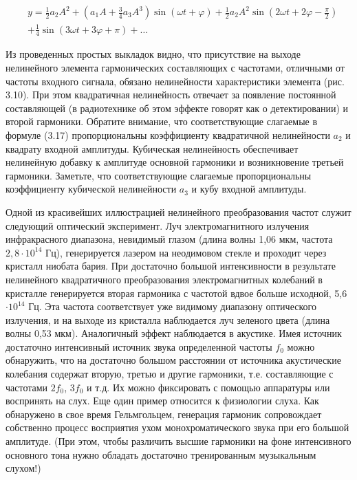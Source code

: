 \documentclass[10pt]{article}
\begin{document}
\begin{align*}
& y=\frac{1}{2} a_{2} A^{2}+\left(a_{1} A+\frac{3}{4} a_{3} A^{3}\right) \sin (\omega t+\varphi)+\frac{1}{2} a_{2} A^{2} \sin \left(2 \omega t+2 \varphi-\frac{\pi}{2}\right) \\
& +\frac{1}{4} \sin (3 \omega t+3 \varphi+\pi)+\ldots \tag{3.17}
\end{align*}


Из проведенных простых выкладок видно, что присутствие на выходе нелинейного элемента гармонических составляющих с частотами, отличными от частоты входного сигнала, обязано нелинейности характеристики элемента (рис. 3.10). При этом квадратичная нелинейность отвечает за появление постоянной составляющей (в радиотехнике об этом эффекте говорят как о детектировании) и второй гармоники. Обратите внимание, что соответствующие слагаемые в формуле (3.17) пропорциональны коэффициенту квадратичной нелинейности $a_{2}$ и квадрату входной амплитуды. Кубическая нелинейность обеспечивает нелинейную добавку к амплитуде основной гармоники и возникновение третьей гармоники. Заметьте, что соответствующие слагаемые пропорциональны коэффициенту кубической нелинейности $a_{3}$ и кубу входной амплитуды.

Одной из красивейших иллюстрацией нелинейного преобразования частот служит следующий оптический эксперимент. Луч электромагнитного излучения инфракрасного диапазона, невидимый глазом (длина волны 1,06 мкм, частота $2,8 \cdot 10^{14}$ Гц), генерируется лазером на неодимовом стекле и проходит через кристалл ниобата бария. При достаточно большой интенсивности в результате нелинейного квадратичного преобразования электромагнитных колебаний в кристалле генерируется вторая гармоника с частотой вдвое больше исходной, 5,6 $\cdot 10^{14}$ Гц. Эта частота соответствует уже видимому диапазону оптического излучения, и на выходе из кристалла наблюдается луч зеленого цвета (длина волны 0,53 мкм). Аналогичный эффект наблюдается в акустике. Имея источник достаточно интенсивный источник звука определенной частоты $f_{0}$ можно обнаружить, что на достаточно большом расстоянии от источника акустические колебания содержат вторую, третью и другие гармоники, т.е. составляющие с частотами $2 f_{0}$, $3 f_{0}$ и т.д. Их можно фиксировать с помощью аппаратуры или воспринять на слух. Еще один пример относится к физиологии слуха. Как обнаружено в свое время Гельмгольцем, генерация гармоник сопровождает собственно процесс восприятия ухом монохроматического звука при его большой амплитуде. (При этом, чтобы различить высшие гармоники на фоне интенсивного основного тона нужно обладать достаточно тренированным музыкальным слухом!)
\end{document}
